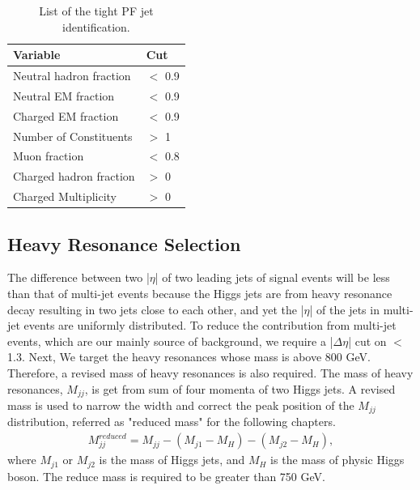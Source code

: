 \begin{table}[h!]
  \begin{center}
    \begin{tabular}{ll}
    Variable & Cut \\
    \hline
    Neutral hadron fraction & $<$ 0.9 \\
    Neutral EM fraction & $<$ 0.9 \\
    Charged EM fraction & $<$ 0.9 \\
    Number of Constituents & $>$ 1 \\
    Muon fraction & $<$ 0.8 \\
    Charged hadron fraction & $>$ 0 \\
    Charged Multiplicity & $>$ 0 \\
	\hline
    \end{tabular}
  \end{center}

  \caption{List of the tight PF jet identification.}
  \end{table}

\subsection{Heavy Resonance Selection} 
The difference between two |$\eta $| of two leading jets of signal events will be less than that of multi-jet events because the Higgs jets are from heavy resonance decay resulting in two jets close to each other, and yet the |$\eta $| of the jets in multi-jet events are uniformly distributed. To reduce the contribution from multi-jet events, which are our mainly source of background, we require a |$\Delta \eta $| cut on $<$ 1.3. 
Next, We target the heavy resonances whose mass is above 800 GeV. Therefore, a revised mass of heavy resonances is also required. The mass of heavy resonances, $M_{jj}$, is get from sum of four momenta of two Higgs jets. A revised mass is used to narrow the width and correct the peak position of the $M_{jj}$ distribution, referred as "reduced mass" for the following chapters.
\begin{equation} \label{eq4}
\begin{split}
M^{reduced}_{jj} = M_{jj} - (M_{j1} - M_{H} ) - (M_{j2} - M_{H} ), 
\end{split}
\end{equation}
where $M_{j1}$ or $M_{j2}$ is the mass of Higgs jets, and $M_{H}$ is the mass of physic Higgs boson. The reduce mass is required to be greater than 750 GeV. 

